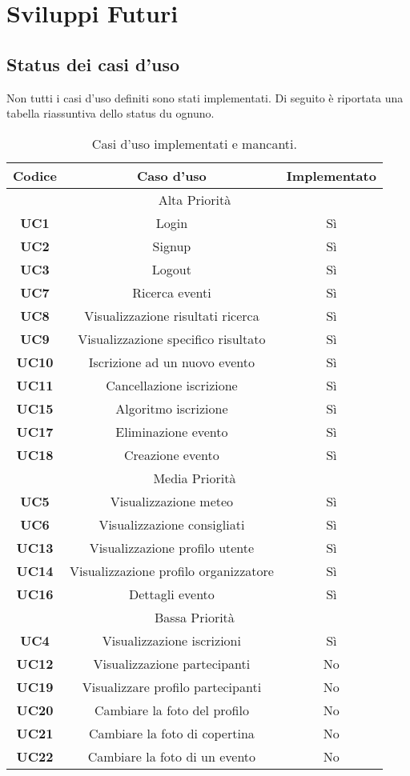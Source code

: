 \section{Sviluppi Futuri}
\subsection{Status dei casi d'uso}
Non tutti i casi d'uso definiti sono stati implementati. Di seguito è riportata una tabella riassuntiva dello status du ognuno.
\begin{table}[h!]
	\centering
	\begin{tabular}{|c|c|c|}
		\hline
		\textbf{Codice} & \textbf{Caso d'uso} & \textbf{Implementato} \\ \hline
		\multicolumn{3}{|c|}{Alta Priorità} \\ \hline
		\textbf{UC1} & Login & Sì\\ \hline
		\textbf{UC2} & Signup & Sì \\ \hline
		\textbf{UC3} & Logout & Sì \\ \hline
		\textbf{UC7} & Ricerca eventi & Sì \\ \hline
		\textbf{UC8} & Visualizzazione risultati ricerca & Sì \\ \hline
		\textbf{UC9} & Visualizzazione specifico risultato & Sì \\ \hline
		\textbf{UC10} & Iscrizione ad un nuovo evento & Sì \\ \hline
		\textbf{UC11} & Cancellazione iscrizione & Sì \\ \hline
		\textbf{UC15} & Algoritmo iscrizione & Sì \\ \hline
		\textbf{UC17} & Eliminazione evento & Sì \\ \hline
		\textbf{UC18} & Creazione evento & Sì \\ \hline
		\multicolumn{3}{|c|}{Media Priorità} \\ \hline
		\textbf{UC5} & Visualizzazione meteo & Sì\\ \hline
		\textbf{UC6} & Visualizzazione consigliati & Sì\\ \hline
		\textbf{UC13} & Visualizzazione profilo utente & Sì\\ \hline
		\textbf{UC14} & Visualizzazione profilo organizzatore & Sì\\ \hline
		\textbf{UC16} & Dettagli evento & Sì\\ \hline
		\multicolumn{3}{|c|}{Bassa Priorità} \\ \hline
		\textbf{UC4} & Visualizzazione iscrizioni & Sì\\ \hline
		\textbf{UC12} & Visualizzazione partecipanti & No\\ \hline
		\textbf{UC19} & Visualizzare profilo partecipanti & No\\ \hline
		\textbf{UC20} & Cambiare la foto del profilo & No\\ \hline
		\textbf{UC21} & Cambiare la foto di copertina & No\\ \hline
		\textbf{UC22} & Cambiare la foto di un evento & No\\ \hline
	\end{tabular}
	\caption{\label{tab:table-name}Casi d'uso implementati e mancanti.}
\end{table}
\newpage
